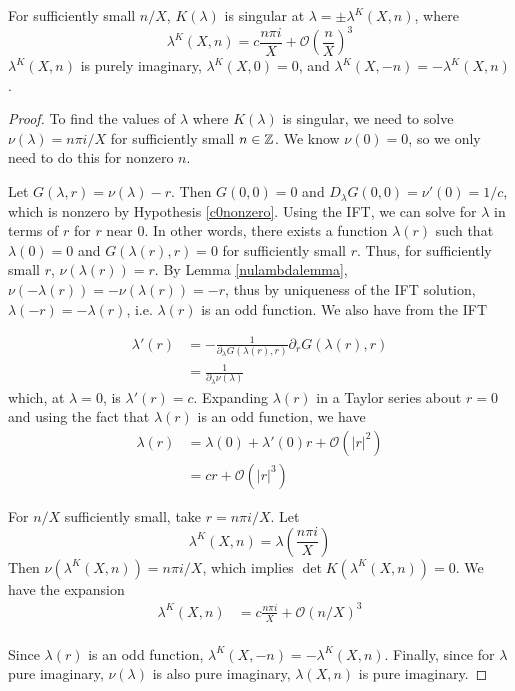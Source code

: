 \documentclass[thesis.tex]{subfiles}
\begin{document}
\begin{lemma}\label{Ksingularlemma}
For sufficiently small $n/X$, $K(\lambda)$ is singular at $\lambda = \pm \lambda^K(X,n)$, where
\begin{equation}\label{lambdaK}
\lambda^K(X,n)
= c \frac{n \pi i }{X} + \mathcal{O}\left( \frac{n}{X} \right)^3
\end{equation} 
$\lambda^K(X,n)$ is purely imaginary, $\lambda^K(X, 0) = 0$, and $\lambda^K(X, -n) = -\lambda^K(X, n)$.
\begin{proof}
To find the values of $\lambda$ where $K(\lambda)$ is singular, we need to solve $\nu(\lambda) = n \pi i/X$ for sufficiently small $n \in \mathbb{Z}$. We know $\nu(0) = 0$, so we only need to do this for nonzero $n$.

Let $G(\lambda, r) = \nu(\lambda) - r$. Then $G(0, 0) = 0$ and $D_\lambda G(0, 0) = \nu'(0) = 1/c$, which is nonzero by Hypothesis \ref{c0nonzero}. Using the IFT, we can solve for $\lambda$ in terms of $r$ for $r$ near 0. In other words, there exists a function $\lambda(r)$ such that $\lambda(0) = 0$ and $G(\lambda(r), r) = 0$ for sufficiently small $r$. Thus, for sufficiently small $r$, $\nu(\lambda(r)) = r$. By Lemma \ref{nulambdalemma}, $\nu(-\lambda(r)) = -\nu(\lambda(r)) = -r$, thus by uniqueness of the IFT solution, $\lambda(-r) = -\lambda(r)$, i.e. $\lambda(r)$ is an odd function. We also have from the IFT 

\begin{align*}
\lambda'(r) &= -\frac{1}{\partial_\lambda G(\lambda(r), r) } \partial_r G(\lambda(r), r) \\
&= \frac{1}{\partial_\lambda \nu(\lambda) } 
\end{align*}
which, at $\lambda = 0$, is $\lambda'(r) = c$. Expanding $\lambda(r)$ in a Taylor series about $r = 0$ and using the fact that $\lambda(r)$ is an odd function, we have
\begin{align*}
\lambda(r) &= \lambda(0) + \lambda'(0) r + \mathcal{O}(|r|^2) \\
&= c r + \mathcal{O}(|r|^3)
\end{align*}

For $n/X$ sufficiently small, take $r = n \pi i / X$. Let 
\[
\lambda^K(X, n) = \lambda\left( \frac{n \pi i}{X} \right)
\]
Then $\nu(\lambda^K(X, n)) = n \pi i / X$, which implies $\det K(\lambda^K(X, n)) = 0$. We have the expansion
\begin{align*}
\lambda^K(X,n)
&= c \frac{n \pi i }{X} + \mathcal{O}(n/X)^3 \\
\end{align*} 

Since $\lambda(r)$ is an odd function, $\lambda^K(X,-n) = -\lambda^K(X,n)$. Finally, since for $\lambda$ pure imaginary, $\nu(\lambda)$ is also pure imaginary, $\lambda(X,n)$ is pure imaginary.
\end{proof}
\end{lemma}
\end{document}
